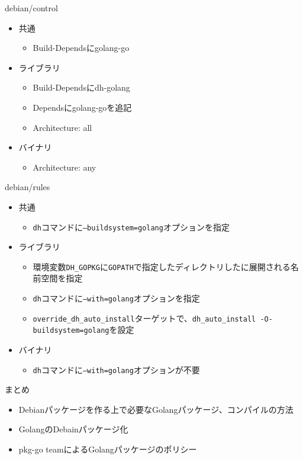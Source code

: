 \begin{frame}{debian/control}
  \begin{itemize}
    \item 共通
      \begin{itemize}
      \item Build-Dependsにgolang-go
      \end{itemize}
    \item ライブラリ
      \begin{itemize}
      \item Build-Dependsにdh-golang
      \item Dependsにgolang-goを追記
      \item Architecture: all
      \end{itemize}
    \item バイナリ
      \begin{itemize}
        \item Architecture: any
      \end{itemize}
  \end{itemize}
\end{frame}

\begin{frame}{debian/rules}
  \begin{itemize}
  \item 共通
    \begin{itemize}
    \item \texttt{dh}コマンドに\texttt{--buildsystem=golang}オプションを指定
    \end{itemize}
  \item ライブラリ
    \begin{itemize}
    \item 環境変数\texttt{DH\_GOPKG}に\texttt{GOPATH}で指定したディレクトリしたに展開される名前空間を指定
    \item \texttt{dh}コマンドに\texttt{--with=golang}オプションを指定
    \item \texttt{override\_dh\_auto\_install}ターゲットで、\texttt{dh\_auto\_install -O-buildsystem=golang}を設定
    \end{itemize}
  \item バイナリ
    \begin{itemize}
      \item \texttt{dh}コマンドに\texttt{--with=golang}オプションが不要
    \end{itemize}
\end{itemize}

\end{frame}

\begin{frame}{まとめ}
\begin{itemize}
  \item Debianパッケージを作る上で必要なGolangパッケージ、コンパイルの方法
  \item GolangのDebainパッケージ化
  \item pkg-go teamによるGolangパッケージのポリシー
\end{itemize}
\end{frame}


